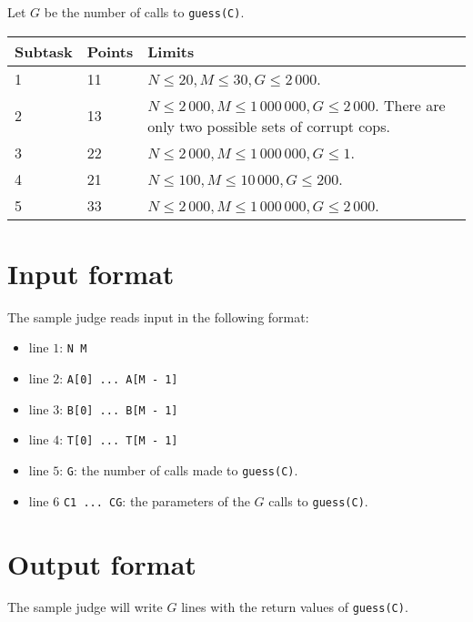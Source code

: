 Let $G$ be the number of calls to \texttt{guess(C)}.
\begin{tabular}{|l|l|l|}
  \hline
  \textbf{Subtask} & \textbf{Points} & \textbf{Limits} \\ \hline
  1 & 11 & $N \le 20, M \le 30, G \le 2\,000$. \\ \hline
  2 & 13 & $N \le 2\,000, M \le 1\,000\,000, G \le 2\,000$. There are only two possible sets of corrupt cops. \\ \hline
  3 & 22 & $N \le 2\,000, M \le 1\,000\,000, G \le 1$. \\ \hline
  4 & 21 & $N \le 100, M \le 10\,000, G \le 200$. \\ \hline
  5 & 33 & $N \le 2\,000, M \le 1\,000\,000, G \le 2\,000$. \\ \hline
\end{tabular}

\section*{Input format}
The sample judge reads input in the following format:

\begin{itemize}
  \item line $1$: \texttt{N M}
  \item line $2$: \texttt{A[0] ... A[M - 1]}
  \item line $3$: \texttt{B[0] ... B[M - 1]}
  \item line $4$: \texttt{T[0] ... T[M - 1]}
  \item line $5$: \texttt{G}: the number of calls made to \texttt{guess(C)}.
  \item line $6$ \texttt{C1 ... CG}: the parameters of the $G$ calls to \texttt{guess(C)}.
\end{itemize}

\section*{Output format}
The sample judge will write $G$ lines with the return values of \texttt{guess(C)}.

